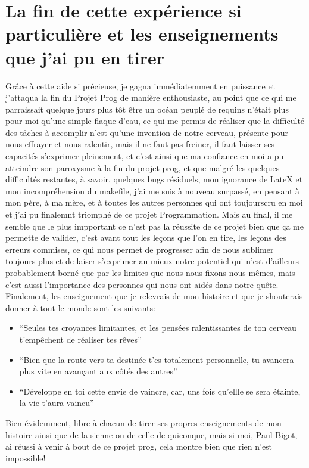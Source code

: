 \documentclass{report}
\begin{document}
\section{La fin de cette expérience si particulière et les enseignements que j'ai pu en tirer}
Grâce à cette aide si précieuse, je gagna immédiatemment en puissance et j'attaqua la fin du Projet Prog de manière enthousiaste, au point que ce qui me parraissait quelque jours plus tôt être un océan peuplé de requins n'était plus pour moi qu'une simple flaque d'eau, ce qui me permis de réaliser que la difficulté des tâches à accomplir n'est qu'une invention de notre cerveau, présente pour nous effrayer et nous ralentir, mais il ne faut pas freiner, il faut laisser ses capacités s'exprimer pleinement, et c'est ainsi que ma confiance en moi a pu atteindre son paroxysme à la fin du projet prog, et que malgré les quelques difficultés restantes, à savoir, quelques bugs résiduels, mon ignorance de LateX et mon incompréhension du makefile, j'ai me suis à nouveau surpassé, en pensant à mon père, à ma mère, et à toutes les autres personnes qui ont toujourscru en moi et j'ai pu finalemnt triomphé de ce projet Programmation. Mais au final, il me semble que le plus impportant ce n'est pas la réussite de ce projet bien que ça me permette de valider, c'est avant tout les leçons que l'on en tire, les leçons des erreurs commises, ce qui nous permet de progresser afin de nous sublimer toujours plus et de laiser s'exprimer au mieux notre potentiel qui n'est d'ailleurs probablement borné que par les limites que nous nous fixons nous-mêmes, mais c'est aussi l'importance des personnes qui nous ont aidés dans notre quête.
Finalement, les enseignement que je relevrais de mon histoire et que je shouterais donner à tout le monde sont les suivants:
\begin{itemize}
 \item ``Seules tes croyances limitantes, et les pensées ralentissantes de ton cerveau t'empêchent de réaliser tes rêves''
 \item ``Bien que la route vers ta destinée t'es totalement personnelle, tu avancera plus vite en avançant aux côtés des autres''
 \item ``Développe en toi cette envie de vaincre, car, uns fois qu'ellle se sera étainte, la vie t'aura vaincu''
\end{itemize}
Bien évidemment, libre à chacun de tirer ses propres enseignements de mon histoire ainsi que de la sienne ou de celle de quiconque, mais si moi, Paul Bigot, ai réussi à venir à bout de ce projet prog, cela montre bien que rien n'est impossible!
\end{document}
